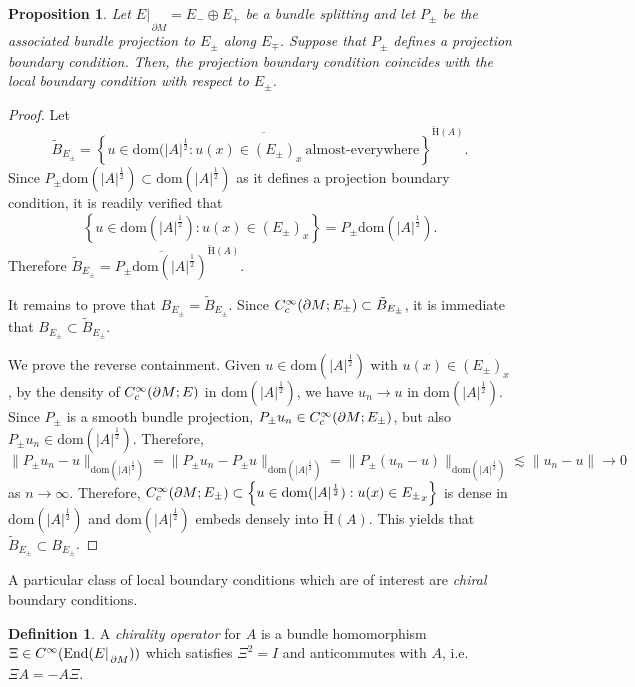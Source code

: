 \documentclass[a4paper,10pt,reqno]{amsart}
\newcommand{\rest}[1]{{{\lvert_{}}_{}}_{#1}}
\newcommand{\dbrac}[1]{\left\{#1\right\}}
\newcommand{\modulus}[1]{|#1|}
\newcommand{\norm}[1]{\| #1 \|}%
\newcommand{\set}[1]{\dbrac{#1}}
\newcommand{\Ck}[2][{}]{{\rm C}^{#2}_{\rm #1}}%
\newcommand{\checkH}{\check{\mathrm{H}}}
\newcommand{\dom}{\mathrm{dom}}
\newcommand{\close}[1]{\overline{#1}}
\DeclareMathOperator{\End}{End} %
\newcommand{\dM}{\partial M}
\newtheorem{proposition}[theorem]{Proposition}
\theoremstyle{definition}
\newtheorem{definition}[theorem]{Definition}
\begin{document}
\begin{proposition}
\label{Prop:LocalProjBC}
Let $E\rest{\dM} = E_- \oplus E_+$ be a bundle splitting and let $P_{\pm}$ be the associated bundle projection to $E_{\pm}$ along $E_{\mp}$.
Suppose that $P_\pm $ defines a projection boundary condition.
Then, the projection boundary condition coincides with the local boundary condition with respect to $E_\pm $.
\end{proposition}
\begin{proof}
Let
$$
\tilde{B}_{E_\pm } = \close{\set{u \in \dom(\modulus{A}^{\frac12}: u(x) \in (E_\pm )_x\ \text{almost-everywhere}}}^{\checkH(A)}.$$
Since $P_\pm \dom(\modulus{A}^{\frac12}) \subset \dom(\modulus{A}^{\frac12})$ as it defines a projection boundary condition, it is readily verified that
\[
\set{u \in \dom(\modulus{A}^{\frac12}): u(x) \in (E_\pm )_x} = P_\pm  \dom(\modulus{A}^{\frac12}).
\]
Therefore $\tilde{B}_{E_\pm } = \close{P_\pm \dom(\modulus{A}^{\frac12})}^{\checkH(A)}$.

It remains to prove that $B_{E_\pm } = \tilde{B}_{E_\pm }$.
Since $\Ck[c]{\infty}(\dM;E_\pm ) \subset \tilde{B}_{E_\pm }$, it is immediate  that $B_{E_\pm } \subset \tilde{B}_{E_\pm }$.

We prove the reverse containment.
Given $u \in \dom(\modulus{A}^{\frac12})$ with $u(x) \in (E_\pm )_x$, by the density of $\Ck[c]{\infty}(\dM;E)$ in $\dom(\modulus{A}^{\frac12})$, we have $u_n \to u$ in $\dom(\modulus{A}^{\frac12})$.
Since $P_\pm $ is a smooth bundle projection, $P_\pm u_n \in \Ck[c]{\infty}(\dM;E_\pm )$, but also $P_\pm u_n \in \dom(\modulus{A}^{\frac12})$.
Therefore,
$$\norm{P_\pm u_n - u}_{\dom(\modulus{A}^{\frac12})}
= \norm{P_\pm u_n - P_\pm u}_{\dom(\modulus{A}^{\frac12})}
= \norm{P_\pm (u_n - u)}_{\dom(\modulus{A}^{\frac12})}
\lesssim \norm{u_n - u} \to 0$$
as $n \to \infty$.
Therefore, $\Ck[c]{\infty}(\dM;E_\pm ) \subset \set{u \in \dom(\modulus{A}^{\frac12}): u(x) \in {E_\pm }_x}$ is dense in $\dom(\modulus{A}^{\frac12})$ and $\dom(\modulus{A}^{\frac12})$ embeds densely into $\checkH(A)$.
This yields that $\tilde{B}_{E_\pm } \subset B_{E_\pm }$.
\end{proof}

A particular class of local boundary conditions which are of interest are \emph{chiral} boundary conditions.

\begin{definition}
A \emph{chirality operator} for $A$ is a bundle homomorphism $\Xi \in \Ck{\infty}(\End(E\rest{\dM}))$ which satisfies $\Xi^2 = I$ and anticommutes with $A$, i.e.\ $\Xi A = - A \Xi$.
\end{definition}
\end{document}
